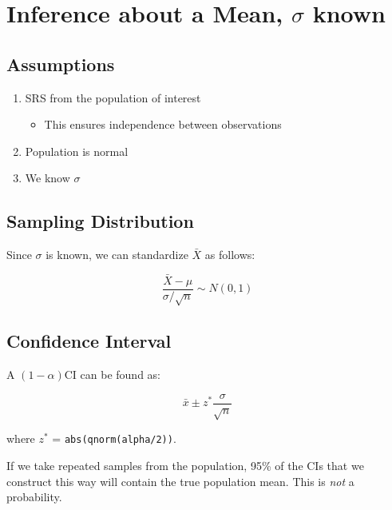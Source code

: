 \documentclass[
  letterpaper,
  DIV=11,
  numbers=noendperiod]{scrreprt}
\providecommand{\tightlist}{%
  \setlength{\itemsep}{0pt}\setlength{\parskip}{0pt}}\usepackage{longtable,booktabs,array}
\begin{document}
\hypertarget{inference-about-a-mean-sigma-known}{%
\section{\texorpdfstring{Inference about a Mean, \(\sigma\)
known}{Inference about a Mean, \textbackslash sigma known}}\label{inference-about-a-mean-sigma-known}}

\hypertarget{assumptions-2}{%
\subsection{Assumptions}\label{assumptions-2}}

\begin{enumerate}
\def\labelenumi{\arabic{enumi}.}
\tightlist
\item
  SRS from the population of interest

  \begin{itemize}
  \tightlist
  \item
    This ensures independence between observations
  \end{itemize}
\item
  Population is normal
\item
  We know \(\sigma\)
\end{enumerate}

\hypertarget{sampling-distribution}{%
\subsection{Sampling Distribution}\label{sampling-distribution}}

Since \(\sigma\) is known, we can standardize \(\bar X\) as follows:

\[
\frac{\bar X - \mu}{\sigma/\sqrt{n}} \sim N(0,1)
\]

\hypertarget{confidence-interval}{%
\subsection{Confidence Interval}\label{confidence-interval}}

A \((1-\alpha)\)CI can be found as:

\[
\bar x \pm z^*\frac{\sigma}{\sqrt n}
\]

where \(z^*\) = \texttt{abs(qnorm(alpha/2))}.

If we take repeated samples from the population, 95\% of the CIs that we
construct this way will contain the true population mean. This is
\emph{not} a probability.
\end{document}
